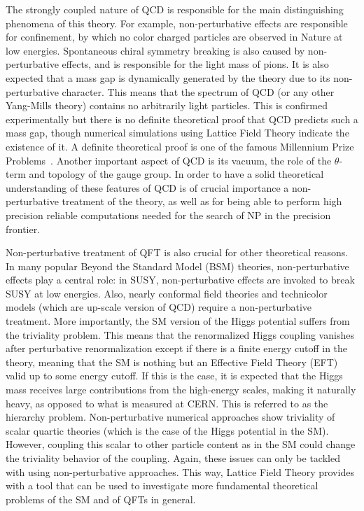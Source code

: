 The strongly coupled nature of QCD is responsible for the main distinguishing phenomena of this theory. For example, non-perturbative effects are responsible for confinement, by which no color charged particles are observed in Nature at low energies. Spontaneous chiral symmetry breaking is also caused by non-perturbative effects, and is responsible for the light mass of pions. It is also expected that a mass gap is dynamically generated by the theory due to its non-perturbative character. This means that the spectrum of QCD (or any other Yang-Mills theory) contains no arbitrarily light particles. This is confirmed experimentally but there is no definite theoretical proof that QCD predicts such a mass gap, though numerical simulations using Lattice Field Theory indicate the existence of it. A definite theoretical proof is one of the famous Millennium Prize Problems~\citep{MillenniumPrizeproblems}. Another important aspect of QCD is its vacuum, the role of the $\theta$-term and topology of the gauge group. In order to have a solid theoretical understanding of these features of QCD is of crucial importance a non-perturbative treatment of the theory, as well as for being able to perform high precision reliable computations needed for the search of NP in the precision frontier.

Non-perturbative treatment of QFT is also crucial for other theoretical reasons. In many popular Beyond the Standard Model (BSM) theories, non-perturbative effects play a central role: in SUSY, non-perturbative effects are invoked to break SUSY at low energies. Also, nearly conformal field theories and technicolor models (which are up-scale version of QCD) require a non-perturbative treatment. More importantly, the SM version of the Higgs potential suffers from the triviality problem. This means that the renormalized Higgs coupling vanishes after perturbative renormalization except if there is a finite energy cutoff in the theory, meaning that the SM is nothing but an Effective Field Theory (EFT) valid up to some energy cutoff. If this is the case, it is expected that the Higgs mass receives large contributions from the high-energy scales, making it naturally heavy, as opposed to what is measured at CERN. This is referred to as the hierarchy problem. Non-perturbative numerical approaches show triviality of scalar quartic theories (which is the case of the Higgs potential in the SM). However, coupling this scalar to other particle content as in the SM could change the triviality behavior of the coupling. Again, these issues can only be tackled with using non-perturbative approaches. This way, Lattice Field Theory provides with a tool that can be used to investigate more fundamental theoretical problems of the SM and of QFTs in general.

